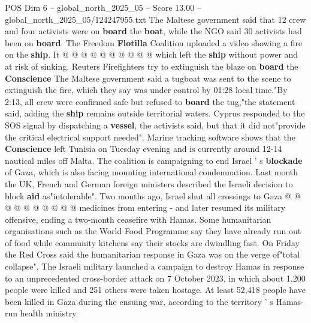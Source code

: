 \begin{textsample}{POS Dim 6 – global\_north\_2025\_05 – Score 13.00 – global\_north\_2025\_05/124247955.txt}
The Maltese government said that 12 crew and four activists were on \textbf{board} the \textbf{boat}, while the NGO said 30 activists had been on \textbf{board}.
The Freedom \textbf{Flotilla} Coalition uploaded a video showing a fire on the \textbf{ship}.
It @ @ @ @ @ @ @ @ @ @ which left the \textbf{ship} without power and at risk of sinking.
Reuters Firefighters try to extinguish the blaze on \textbf{board} the \textbf{Conscience} The Maltese government said a tugboat was sent to the scene to extinguish the fire, which they say was under control by 01:28 local time."By 2:13, all crew were confirmed safe but refused to \textbf{board} the tug,"the statement said, adding the \textbf{ship} remains outside territorial waters.
Cyprus responded to the SOS signal by dispatching a \textbf{vessel}, the activists said, but that it did not"provide the critical electrical support needed".
Marine tracking software shows that the \textbf{Conscience} left Tunisia on Tuesday evening and is currently around 12-14 nautical miles off Malta.
The coalition is campaigning to end Israel ' s \textbf{blockade} of Gaza, which is also facing mounting international condemnation.
Last month the UK, French and German foreign ministers described the Israeli decision to block \textbf{aid} as"intolerable".
Two months ago, Israel shut all crossings to Gaza @ @ @ @ @ @ @ @ @ @ medicines from entering - and later resumed its military offensive, ending a two-month ceasefire with Hamas.
Some humanitarian organisations such as the World Food Programme say they have already run out of food while community kitchens say their stocks are dwindling fast.
On Friday the Red Cross said the humanitarian response in Gaza was on the verge of"total collapse".
The Israeli military launched a campaign to destroy Hamas in response to an unprecedented cross-border attack on 7 October 2023, in which about 1,200 people were killed and 251 others were taken hostage.
At least 52,418 people have been killed in Gaza during the ensuing war, according to the territory ' s Hamas-run health ministry.

\end{textsample}
